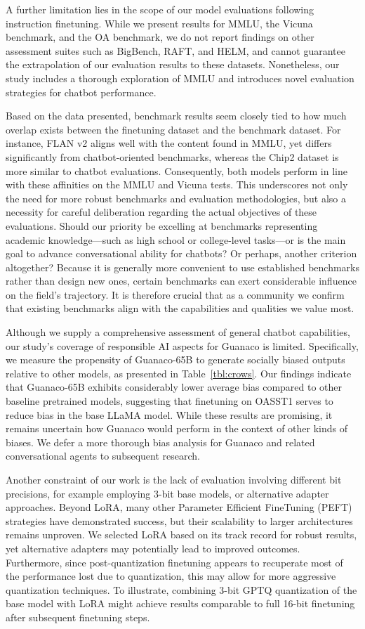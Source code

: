 A further limitation lies in the scope of our model evaluations following instruction finetuning. While we present results for MMLU, the Vicuna benchmark, and the OA benchmark, we do not report findings on other assessment suites such as BigBench, RAFT, and HELM, and cannot guarantee the extrapolation of our evaluation results to these datasets. Nonetheless, our study includes a thorough exploration of MMLU and introduces novel evaluation strategies for chatbot performance.

Based on the data presented, benchmark results seem closely tied to how much overlap exists between the finetuning dataset and the benchmark dataset. For instance, FLAN v2 aligns well with the content found in MMLU, yet differs significantly from chatbot-oriented benchmarks, whereas the Chip2 dataset is more similar to chatbot evaluations. Consequently, both models perform in line with these affinities on the MMLU and Vicuna tests. This underscores not only the need for more robust benchmarks and evaluation methodologies, but also a necessity for careful deliberation regarding the actual objectives of these evaluations. Should our priority be excelling at benchmarks representing academic knowledge—such as high school or college-level tasks—or is the main goal to advance conversational ability for chatbots? Or perhaps, another criterion altogether? Because it is generally more convenient to use established benchmarks rather than design new ones, certain benchmarks can exert considerable influence on the field’s trajectory. It is therefore crucial that as a community we confirm that existing benchmarks align with the capabilities and qualities we value most.

Although we supply a comprehensive assessment of general chatbot capabilities, our study’s coverage of responsible AI aspects for {Guanaco} is limited. Specifically, we measure the propensity of {Guanaco}-65B to generate socially biased outputs relative to other models, as presented in Table~\ref{tbl:crows}. Our findings indicate that {Guanaco}-65B exhibits considerably lower average bias compared to other baseline pretrained models, suggesting that finetuning on OASST1 serves to reduce bias in the base LLaMA model. While these results are promising, it remains uncertain how {Guanaco} would perform in the context of other kinds of biases. We defer a more thorough bias analysis for {Guanaco} and related conversational agents to subsequent research.

Another constraint of our work is the lack of evaluation involving different bit precisions, for example employing 3-bit base models, or alternative adapter approaches. Beyond LoRA, many other Parameter Efficient FineTuning (PEFT) strategies have demonstrated success, but their scalability to larger architectures remains unproven. We selected LoRA based on its track record for robust results, yet alternative adapters may potentially lead to improved outcomes. Furthermore, since post-quantization finetuning appears to recuperate most of the performance lost due to quantization, this may allow for more aggressive quantization techniques. To illustrate, combining 3-bit GPTQ quantization of the base model with LoRA might achieve results comparable to full 16-bit finetuning after subsequent finetuning steps.

